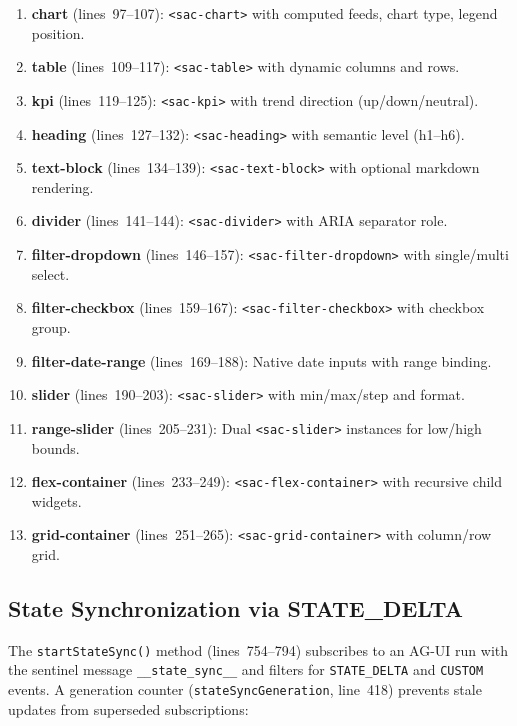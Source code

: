\documentclass[11pt]{article}
\begin{document}
\begin{enumerate}
  \item \textbf{chart} (lines~97--107): \texttt{<sac-chart>} with computed
    feeds, chart type, legend position.
  \item \textbf{table} (lines~109--117): \texttt{<sac-table>} with dynamic
    columns and rows.
  \item \textbf{kpi} (lines~119--125): \texttt{<sac-kpi>} with trend
    direction (up/down/neutral).
  \item \textbf{heading} (lines~127--132): \texttt{<sac-heading>} with
    semantic level (h1--h6).
  \item \textbf{text-block} (lines~134--139): \texttt{<sac-text-block>} with
    optional markdown rendering.
  \item \textbf{divider} (lines~141--144): \texttt{<sac-divider>} with ARIA
    separator role.
  \item \textbf{filter-dropdown} (lines~146--157): \texttt{<sac-filter-dropdown>}
    with single/multi select.
  \item \textbf{filter-checkbox} (lines~159--167): \texttt{<sac-filter-checkbox>}
    with checkbox group.
  \item \textbf{filter-date-range} (lines~169--188): Native date inputs with
    range binding.
  \item \textbf{slider} (lines~190--203): \texttt{<sac-slider>} with
    min/max/step and format.
  \item \textbf{range-slider} (lines~205--231): Dual \texttt{<sac-slider>}
    instances for low/high bounds.
  \item \textbf{flex-container} (lines~233--249): \texttt{<sac-flex-container>}
    with recursive child widgets.
  \item \textbf{grid-container} (lines~251--265): \texttt{<sac-grid-container>}
    with column/row grid.
\end{enumerate}

\subsection{State Synchronization via STATE\_DELTA}

The \texttt{startStateSync()} method (lines~754--794) subscribes to an AG-UI
run with the sentinel message \texttt{\_\_state\_sync\_\_} and filters for
\texttt{STATE\_DELTA} and \texttt{CUSTOM} events. A generation counter
(\texttt{stateSyncGeneration}, line~418) prevents stale updates from
superseded subscriptions:
\end{document}
